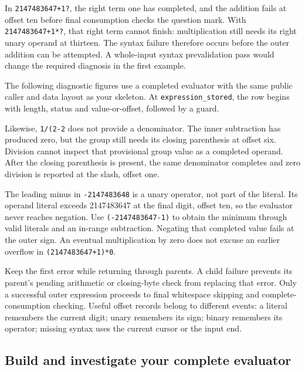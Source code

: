 

In \texttt{2147483647+1?}, the right term one has completed, and the addition
fails at offset ten before final consumption checks the question mark. With
\texttt{2147483647+1*?}, that right term cannot finish: multiplication still
needs its right unary operand at thirteen. The syntax failure therefore occurs
before the outer addition can be attempted. A whole-input syntax prevalidation
pass would change the required diagnosis in the first example.

The following diagnostic figures use a completed evaluator with the same public
caller and data layout as your skeleton. At \texttt{expression\_stored}, the
row begins with length, status and value-or-offset, followed by a guard.



Likewise, \texttt{1/(2-2} does not provide a denominator. The inner subtraction
has produced zero, but the group still needs its closing parenthesis at offset
six. Division cannot inspect that provisional group value as a completed operand.
After the closing parenthesis is present, the same denominator completes and
zero division is reported at the slash, offset one.



The leading minus in \texttt{-2147483648} is a unary operator, not part of the
literal. Its operand literal exceeds 2147483647 at the final digit, offset ten,
so the evaluator never reaches negation. Use \texttt{(-2147483647-1)} to obtain
the minimum through valid literals and an in-range subtraction. Negating that
completed value fails at the outer sign. An eventual multiplication by zero
does not excuse an earlier overflow in \texttt{(2147483647+1)*0}.

Keep the first error while returning through parents. A child failure prevents
its parent's pending arithmetic or closing-byte check from replacing that error.
Only a successful outer expression proceeds to final whitespace skipping and
complete-consumption checking. Useful offset records belong to different events:
a literal remembers the current digit; unary remembers its sign; binary remembers
its operator; missing syntax uses the current cursor or the input end.

\subsection*{Build and investigate your complete evaluator}

